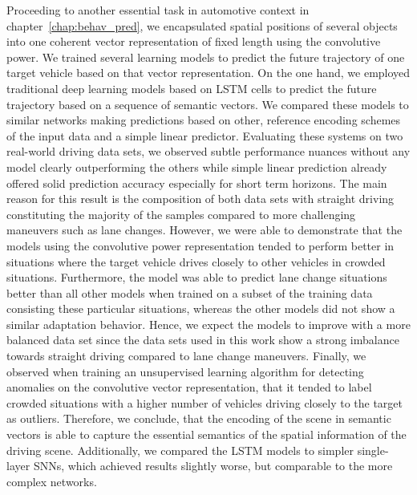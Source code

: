 Proceeding to another essential task in automotive context in chapter~\ref{chap:behav_pred}, we encapsulated spatial positions of several objects into one coherent vector representation of fixed length using the convolutive power.
We trained several learning models to predict the future trajectory of one target vehicle based on that vector representation.
On the one hand, we employed traditional deep learning models based on \ac{LSTM} cells to predict the future trajectory based on a sequence of semantic vectors.
We compared these models to similar networks making predictions based on other, reference encoding schemes of the input data and a simple linear predictor.
Evaluating these systems on two real-world driving data sets, we observed subtle performance nuances without any model clearly outperforming the others while simple linear prediction already offered solid prediction accuracy especially for short term horizons.
The main reason for this result is the composition of both data sets with straight driving constituting the majority of the samples compared to more challenging maneuvers such as lane changes.
However, we were able to demonstrate that the models using the convolutive power representation tended to perform better in situations where the target vehicle drives closely to other vehicles in crowded situations.
Furthermore, the model was able to predict lane change situations better than all other models when trained on a subset of the training data consisting these particular situations, whereas the other models did not show a similar adaptation behavior.
Hence, we expect the models to improve with a more balanced data set since the data sets used in this work show a strong imbalance towards straight driving compared to lane change maneuvers.
Finally, we observed when training an unsupervised learning algorithm for detecting anomalies on the convolutive vector representation, that it tended to label crowded situations with a higher number of vehicles driving closely to the target as outliers.
Therefore, we conclude, that the encoding of the scene in semantic vectors is able to capture the essential semantics of the spatial information of the driving scene.
Additionally, we compared the \ac{LSTM} models to simpler single-layer \acp{SNN}, which achieved results slightly worse, but comparable to the more complex networks.


